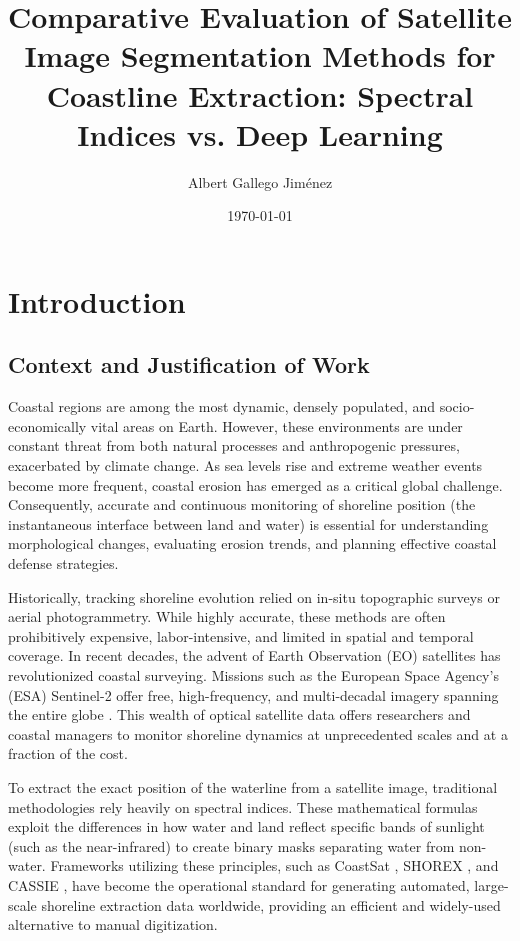 ﻿\documentclass[ENG]{TFUOC}%
\title{Comparative Evaluation of Satellite Image Segmentation Methods for Coastline Extraction: Spectral Indices vs. Deep Learning}
\author{Albert Gallego Jiménez}
\date{\today}
\begin{document}
\estructura

\tableofcontents

\listoffigures

\listoftables

\chapter{Introduction}

\section{Context and Justification of Work}

Coastal regions are among the most dynamic, densely populated, and socio-economically vital areas on Earth. However, these environments are under constant threat from both natural processes and anthropogenic pressures, exacerbated by climate change. As sea levels rise and extreme weather events become more frequent, coastal erosion has emerged as a critical global challenge. Consequently, accurate and continuous monitoring of shoreline position (the instantaneous interface between land and water) is essential for understanding morphological changes, evaluating erosion trends, and planning effective coastal defense strategies\citep{vousdoukas_sandy_2020}.

Historically, tracking shoreline evolution relied on in-situ topographic surveys or aerial photogrammetry. While highly accurate, these methods are often prohibitively expensive, labor-intensive, and limited in spatial and temporal coverage. In recent decades, the advent of Earth Observation (EO) satellites has revolutionized coastal surveying. Missions such as the European Space Agency's (ESA) Sentinel-2 offer free, high-frequency, and multi-decadal imagery spanning the entire globe \citep{vitousek_future_2023}. This wealth of optical satellite data offers researchers and coastal managers to monitor shoreline dynamics at unprecedented scales and at a fraction of the cost.

To extract the exact position of the waterline from a satellite image, traditional methodologies rely heavily on spectral indices. These mathematical formulas exploit the differences in how water and land reflect specific bands of sunlight (such as the near-infrared) to create binary masks separating water from non-water. Frameworks utilizing these principles, such as CoastSat \citep{vos_coastsat_2019}, SHOREX \citep{sanchez-garcia_efficient_2020}, and CASSIE \citep{almeida_coastal_2021}, have become the operational standard for generating automated, large-scale shoreline extraction data worldwide, providing an efficient and widely-used alternative to manual digitization.
\end{document}
